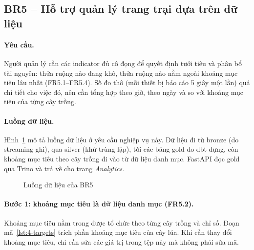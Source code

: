 \subsection{BR5 -- Hỗ trợ quản lý trang trại dựa trên dữ liệu}
\label{sec:4-br05}

\paragraph{Yêu cầu.} Người quản lý cần các indicator đủ cô đọng để quyết định tưới tiêu và phân bổ tài nguyên: thửa ruộng nào đang khô, thửa ruộng nào nằm ngoài khoảng mục tiêu lâu nhất (FR5.1--FR5.4). Số đo thô (mỗi thiết bị báo cáo 5 giây một lần) quá chi tiết cho việc đó, nên cần tổng hợp theo giờ, theo ngày và so với khoảng mục tiêu của từng cây trồng.

\paragraph{Luồng dữ liệu.} Hình~\ref{fig:4-br05-flow} mô tả luồng dữ liệu ở yêu cầu nghiệp vụ này. Dữ liệu đi từ bronze (do streaming ghi), qua silver (khử trùng lặp), tới các bảng gold do dbt dựng, còn khoảng mục tiêu theo cây trồng đi vào từ dữ liệu danh mục. FastAPI đọc gold qua Trino và trả về cho trang \emph{Analytics}.

\begin{figure}[H]
\centering
{}
\caption{Luồng dữ liệu của BR5}
\label{fig:4-br05-flow}
\end{figure}

\paragraph{Bước 1: khoảng mục tiêu là dữ liệu danh mục (FR5.2).} Khoảng mục tiêu nằm trong  được tổ chức theo từng cây trồng và chỉ số. Đoạn mã~\ref{lst:4-targets} trích phần khoảng mục tiêu của cây lúa. Khi cần thay đổi khoảng mục tiêu, chỉ cần sửa các giá trị trong tệp này mà không phải sửa mã.

